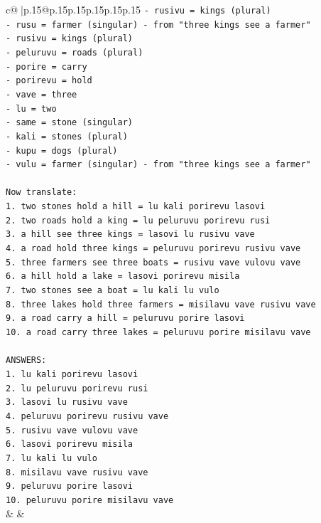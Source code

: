 \documentclass{article}
\begin{document}
{\begin{supertabular}{c@{$\;$}|p{.15\linewidth}@{}p{.15\linewidth}p{.15\linewidth}p{.15\linewidth}p{.15\linewidth}p{.15\linewidth}}
{{{\texttt{{-} rusivu = kings (plural)} \\
\texttt{{-} rusu = farmer (singular) {-} from "three kings see a farmer"} \\
\texttt{{-} rusivu = kings (plural)} \\
\texttt{{-} peluruvu = roads (plural)} \\
\texttt{{-} porire = carry} \\
\texttt{{-} porirevu = hold} \\
\texttt{{-} vave = three} \\
\texttt{{-} lu = two} \\
\texttt{{-} same = stone (singular)} \\
\texttt{{-} kali = stones (plural)} \\
\texttt{{-} kupu = dogs (plural)} \\
\texttt{{-} vulu = farmer (singular) {-} from "three kings see a farmer"} \\
\\ 
\texttt{Now translate:} \\
\texttt{1. two stones hold a hill = lu kali porirevu lasovi} \\
\texttt{2. two roads hold a king = lu peluruvu porirevu rusi} \\
\texttt{3. a hill see three kings = lasovi lu rusivu vave} \\
\texttt{4. a road hold three kings = peluruvu porirevu rusivu vave} \\
\texttt{5. three farmers see three boats = rusivu vave vulovu vave} \\
\texttt{6. a hill hold a lake = lasovi porirevu misila} \\
\texttt{7. two stones see a boat = lu kali lu vulo} \\
\texttt{8. three lakes hold three farmers = misilavu vave rusivu vave} \\
\texttt{9. a road carry a hill = peluruvu porire lasovi} \\
\texttt{10. a road carry three lakes = peluruvu porire misilavu vave} \\
\\ 
\texttt{ANSWERS:} \\
\texttt{1. lu kali porirevu lasovi} \\
\texttt{2. lu peluruvu porirevu rusi} \\
\texttt{3. lasovi lu rusivu vave} \\
\texttt{4. peluruvu porirevu rusivu vave} \\
\texttt{5. rusivu vave vulovu vave} \\
\texttt{6. lasovi porirevu misila} \\
\texttt{7. lu kali lu vulo} \\
\texttt{8. misilavu vave rusivu vave} \\
\texttt{9. peluruvu porire lasovi} \\
\texttt{10. peluruvu porire misilavu vave} \\
            }
        }
    }
    & & \\ \\


\end{supertabular}}
\end{document}
